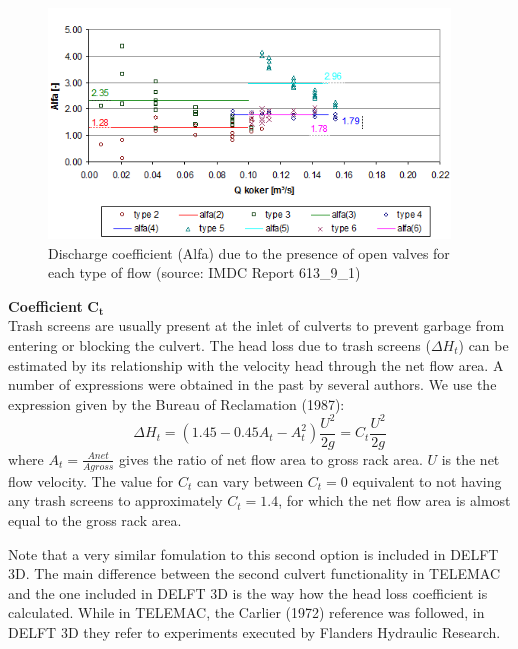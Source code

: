 \begin{figure}[H]
\begin{center}
  \includegraphics[width=0.95\textwidth]{culvert_fig8.png}
\end{center}
\caption{Discharge coefficient (Alfa) due to the presence of open valves for
each type of flow (source: IMDC Report 613\_9\_1)}
\label{fig:culvert_fig8}
\end{figure}

\textbf{Coefficient} $\mathbf{C_t}$\\

Trash screens are usually present at the inlet of culverts to prevent garbage
from entering or blocking the culvert. The head loss due to trash screens
($\Delta H_t$) can be estimated by its relationship with the velocity
head through the net flow area.
A number of expressions were obtained in the past by several authors.
We use the expression given by the Bureau of Reclamation (1987):
\begin{equation}
\Delta H_t = (1.45-0.45A_t-A_t^2)\dfrac{U^2}{2g} = C_t \dfrac{U^2}{2g}
\end{equation}
where $A_t=\frac{Anet}{Agross}$ gives the ratio of net flow area to gross rack area.
$U$ is the net flow velocity. The value for $C_t$ can vary between $C_t= 0$ equivalent
to not having any trash screens to approximately $C_t= 1.4$, for which the net
flow area is almost equal to the gross rack area.

Note that a very similar fomulation to this second option is included in DELFT 3D.
The main difference between the second culvert functionality in TELEMAC and the one
included in DELFT 3D is the way how the head loss coefficient is calculated.
While in TELEMAC, the Carlier (1972) reference was followed, in DELFT 3D they refer
to experiments executed by Flanders Hydraulic Research.


